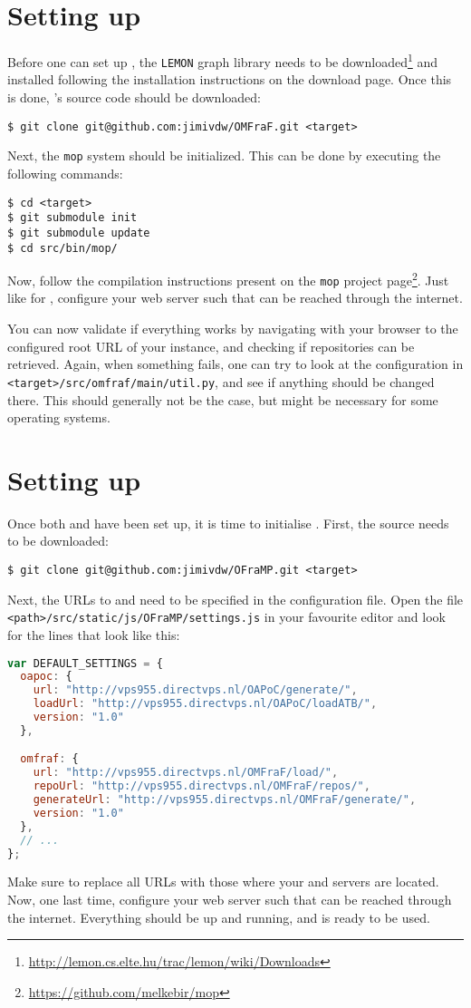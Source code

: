 \section[\omfraf]{Setting up \omfraf}
Before one can set up \omfraf, the \verb|LEMON| graph library needs to be downloaded\footnote{\url{http://lemon.cs.elte.hu/trac/lemon/wiki/Downloads}} and installed following the installation instructions on the download page. Once this is done, \omfraf's source code should be downloaded:
\begin{lstlisting}
$ git clone git@github.com:jimivdw/OMFraF.git <target>
\end{lstlisting}
Next, the \verb|mop| system should be initialized. This can be done by executing the following commands:
\begin{lstlisting}
$ cd <target>
$ git submodule init
$ git submodule update
$ cd src/bin/mop/
\end{lstlisting}
Now, follow the compilation instructions present on the \verb|mop| project page\footnote{\url{https://github.com/melkebir/mop}}. Just like for \oapoc, configure your web server such that \omfraf{} can be reached through the internet.

You can now validate if everything works by navigating with your browser to the configured root URL of your \omfraf{} instance, and checking if repositories can be retrieved. Again, when something fails, one can try to look at the configuration in \verb|<target>/src/omfraf/main/util.py|, and see if anything should be changed there. This should generally not be the case, but might be necessary for some operating systems.



\section[\oframp]{Setting up \oframp}
Once both \oapoc{} and \omfraf{} have been set up, it is time to initialise \oframp. First, the source needs to be downloaded:
\begin{lstlisting}
$ git clone git@github.com:jimivdw/OFraMP.git <target>
\end{lstlisting}
Next, the URLs to \oapoc{} and \omfraf{} need to be specified in the configuration file. Open the file \verb|<path>/src/static/js/OFraMP/settings.js| in your favourite editor and look for the lines that look like this:
\begin{lstlisting}[language=JavaScript]
var DEFAULT_SETTINGS = {
  oapoc: {
    url: "http://vps955.directvps.nl/OAPoC/generate/",
    loadUrl: "http://vps955.directvps.nl/OAPoC/loadATB/",
    version: "1.0"
  },

  omfraf: {
    url: "http://vps955.directvps.nl/OMFraF/load/",
    repoUrl: "http://vps955.directvps.nl/OMFraF/repos/",
    generateUrl: "http://vps955.directvps.nl/OMFraF/generate/",
    version: "1.0"
  },
  // ...
};
\end{lstlisting}
Make sure to replace all URLs with those where your \oapoc{} and \omfraf{} servers are located. Now, one last time, configure your web server such that \oframp{} can be reached through the internet. Everything should be up and running, and \oframp{} is ready to be used.
